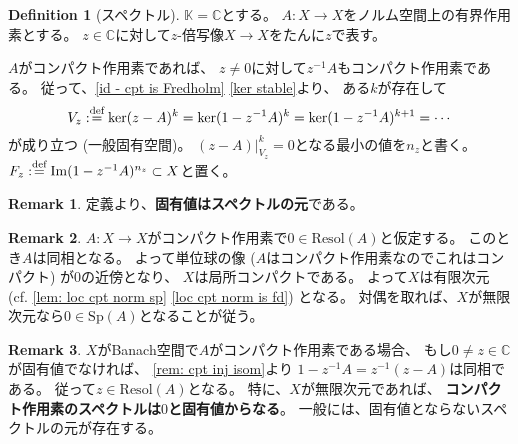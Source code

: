 \documentclass[uplatex]{jsarticle}
\theoremstyle{definition}
\newtheorem{defi}[defi]{Definition}
\newtheorem{rem}[rem]{Remark}
\DeclareMathOperator{\im}{\mathrm{Im}}
\newcommand{\dfn}{:\overset{\mbox{{\scriptsize def}}}{=}}
\newcommand{\C}{\mathbb{C}}
\newcommand{\K}{\mathbb{K}}
\newcommand{\resol}{\mathrm{Resol}}
\newcommand{\spectm}{\mathrm{Sp}}
\begin{document}
\begin{defi}[スペクトル]
  \label{defi: spectm}
  \(\K=\C\)とする。
  \(A:X\to X\)をノルム空間上の有界作用素とする。
  \(z\in \C\)に対して\(z\)-倍写像\(X\to X\)をたんに\(z\)で表す。
  \(A\)がコンパクト作用素であれば、
  \(z\neq 0\)に対して\(z^{-1}A\)もコンパクト作用素である。
  従って、\autoref{id - cpt is Fredholm} \ref{ker stable}より、
  ある\(k\)が存在して
  \[V_z\dfn \ker(z-A)^k = \ker(1-z^{-1}A)^k = \ker(1-z^{-1}A)^{k+1} = \cdots\]
  が成り立つ (一般固有空間)。
  \((z-A)|_{V_z}^k=0\)となる最小の値を\(n_z\)と書く。
  \(F_z\dfn \im(1-z^{-1}A)^{n_z}\subset X\)と置く。
\end{defi}



\begin{rem}
  定義より、\textbf{固有値はスペクトルの元}である。
\end{rem}




\begin{rem}
  \(A:X\to X\)がコンパクト作用素で\(0\in \resol(A)\)と仮定する。
  このとき\(A\)は同相となる。
  よって単位球の像 (\(A\)はコンパクト作用素なのでこれはコンパクト) が\(0\)の近傍となり、
  \(X\)は局所コンパクトである。
  よって\(X\)は有限次元
  (cf. \autoref{lem: loc cpt norm sp} \ref{loc cpt norm is fd}) となる。
  対偶を取れば、\(X\)が無限次元なら\(0\in \spectm(A)\)となることが従う。
\end{rem}



\begin{rem}
  \(X\)がBanach空間で\(A\)がコンパクト作用素である場合、
  もし\(0\neq z\in \C\)が固有値でなければ、
  \autoref{rem: cpt inj isom}より
  \(1-z^{-1}A = z^{-1}(z-A)\)は同相である。
  従って\(z\in\resol(A)\)となる。
  特に、\(X\)が無限次元であれば、
  \textbf{コンパクト作用素のスペクトルは\(0\)と固有値からなる}。
  一般には、固有値とならないスペクトルの元が存在する。
\end{rem}
\end{document}

